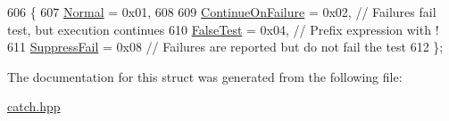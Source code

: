 \begin{DoxyCode}
606                    \{
607             \hyperlink{struct_catch_1_1_result_disposition_a3396cad6e2259af326b3aae93e23e9d8af3bd52347ed6f8796e8ce2f77bb39ea5}{Normal} = 0x01,
608 
609             \hyperlink{struct_catch_1_1_result_disposition_a3396cad6e2259af326b3aae93e23e9d8aa18c94bd60c5614e17a84c2ced3bbfd5}{ContinueOnFailure} = 0x02,   \textcolor{comment}{// Failures fail test, but execution continues}
610             \hyperlink{struct_catch_1_1_result_disposition_a3396cad6e2259af326b3aae93e23e9d8a9980604245f19884691f941dec03eeb8}{FalseTest} = 0x04,           \textcolor{comment}{// Prefix expression with !}
611             \hyperlink{struct_catch_1_1_result_disposition_a3396cad6e2259af326b3aae93e23e9d8a1a88eb6004bddee4ccae4b421991bf54}{SuppressFail} = 0x08         \textcolor{comment}{// Failures are reported but do not fail the test}
612         \};
\end{DoxyCode}


The documentation for this struct was generated from the following file\-:\begin{DoxyCompactItemize}
\item 
\hyperlink{catch_8hpp}{catch.\-hpp}\end{DoxyCompactItemize}
